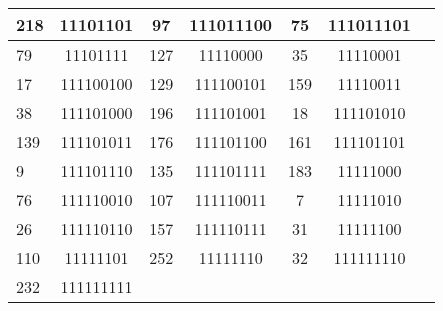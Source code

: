 \documentclass[conference,onecolumn,12pt]{IEEEtran}
\numberwithin{equation}{subsection}
\begin{document}
\begin{table}[h]
\begin{tabular}{lcccccc}
218 & 11101101 & 97 & 111011100 & 75 & 111011101 \\ \hline
79 & 11101111 & 127 & 11110000 & 35 & 11110001 \\ \hline
17 & 111100100 & 129 & 111100101 & 159 & 11110011 \\ \hline
38 & 111101000 & 196 & 111101001 & 18 & 111101010 \\ \hline
139 & 111101011 & 176 & 111101100 & 161 & 111101101 \\ \hline
9 & 111101110 & 135 & 111101111 & 183 & 11111000 \\ \hline
76 & 111110010 & 107 & 111110011 & 7 & 11111010 \\ \hline
26 & 111110110 & 157 & 111110111 & 31 & 11111100 \\ \hline
110 & 11111101 & 252 & 11111110 & 32 & 111111110 \\ \hline
232 & 111111111 &  &  &  &  \\ \hline
\end{tabular}
\end{table}
\end{document}

